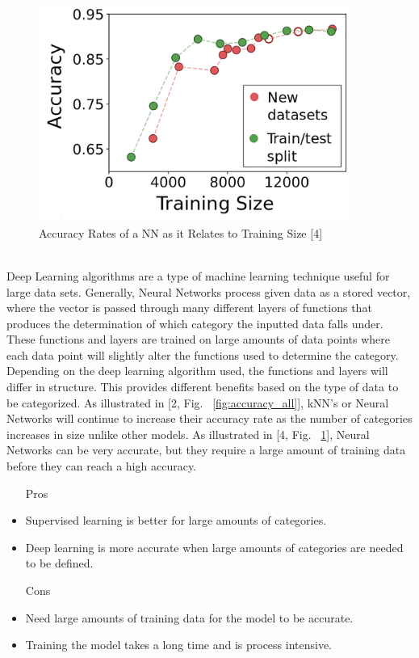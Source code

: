 \documentclass[12pt,journal,compsoc]{IEEEtran}
\newenvironment{subs}
  {\adjustwidth{1em}{0pt}}
  {\endadjustwidth}
\begin{document}
\begin{subs}
\begin{subs}
\begin{subs}
\begin{figure}[H]
\centering
\includegraphics[width=4in]{images/cnn_accuracy.png}
\caption{Accuracy Rates of a NN as it Relates to Training Size [4]}
\label{fig:accuracy_nn}
\end{figure}

\\
Deep Learning algorithms are a type of machine learning technique useful for large data sets. Generally, Neural Networks process given data as a stored vector, where the vector is passed through many different layers of functions that produces the determination of which category the inputted data falls under. These functions and layers are trained on large amounts of data points where each data point will slightly alter the functions used to determine the category. Depending on the deep learning algorithm used, the functions and layers will differ in structure. This provides different benefits based on the type of data to be categorized. As illustrated in [2, Fig. ~\ref{fig:accuracy_all}], kNN’s or Neural Networks will continue to increase their accuracy rate as the number of categories increases in size unlike other models. As illustrated in [4, Fig. ~\ref{fig:accuracy_nn}], Neural Networks can be very accurate, but they require a large amount of training data before they can reach a high accuracy.

\begin{subs}
\begin{itemize}
    \item [{Pros}]
    \item Supervised learning is better for large amounts of categories.
    \item Deep learning is more accurate when large amounts of categories are needed to be defined.
    \item [{Cons}]
    \item Need large amounts of training data for the model to be accurate.
    \item Training the model takes a long time and is process intensive.
\end{itemize}
\end{subs}



\end{subs}
\end{subs}
\end{subs}
\end{document}
